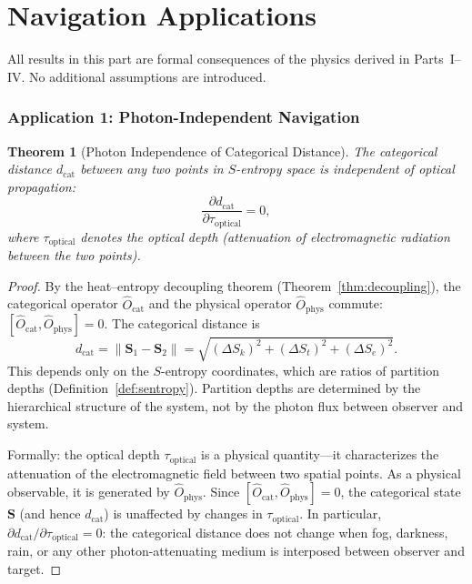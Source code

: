 \documentclass[11pt,twocolumn,a4paper]{article}
\theoremstyle{plain}
\newtheorem{theorem}{Theorem}[section]
\theoremstyle{definition}
\theoremstyle{remark}
\newcommand{\Sk}{S_k}
\newcommand{\St}{S_t}
\newcommand{\Se}{S_e}
\newcommand{\Ocat}{\hat{O}_{\mathrm{cat}}}
\newcommand{\Ophys}{\hat{O}_{\mathrm{phys}}}
\newcommand{\dcat}{d_{\mathrm{cat}}}
\begin{document}
\part{Navigation Applications}
\label{part:applications}

All results in this part are formal consequences of the physics derived in Parts~I--IV. No additional assumptions are introduced.

\section{Application 1: Photon-Independent Navigation}
\label{sec:photon_independent}

\begin{theorem}[Photon Independence of Categorical Distance]
\label{thm:photon_independence}
The categorical distance $\dcat$ between any two points in $S$-entropy space is independent of optical propagation:
\begin{equation}
\frac{\partial \dcat}{\partial \tau_{\mathrm{optical}}} = 0,
\label{eq:photon_independence}
\end{equation}
where $\tau_{\mathrm{optical}}$ denotes the optical depth (attenuation of electromagnetic radiation between the two points).
\end{theorem}

\begin{proof}
By the heat--entropy decoupling theorem (Theorem~\ref{thm:decoupling}), the categorical operator $\Ocat$ and the physical operator $\Ophys$ commute: $[\Ocat, \Ophys] = 0$. The categorical distance is
\begin{equation}
\dcat = \|\mathbf{S}_1 - \mathbf{S}_2\| = \sqrt{(\Delta\Sk)^2 + (\Delta\St)^2 + (\Delta\Se)^2}.
\end{equation}
This depends only on the $S$-entropy coordinates, which are ratios of partition depths (Definition~\ref{def:sentropy}). Partition depths are determined by the hierarchical structure of the system, not by the photon flux between observer and system.

Formally: the optical depth $\tau_{\mathrm{optical}}$ is a physical quantity---it characterizes the attenuation of the electromagnetic field between two spatial points. As a physical observable, it is generated by $\Ophys$. Since $[\Ocat, \Ophys] = 0$, the categorical state $\mathbf{S}$ (and hence $\dcat$) is unaffected by changes in $\tau_{\mathrm{optical}}$. In particular, $\partial \dcat / \partial \tau_{\mathrm{optical}} = 0$: the categorical distance does not change when fog, darkness, rain, or any other photon-attenuating medium is interposed between observer and target.
\end{proof}
\end{document}
